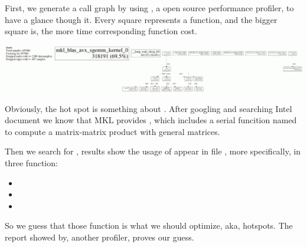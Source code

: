 \documentclass{article}
\begin{document}
\noindent{}First, we generate a call graph by using ,
 a open source performance profiler, to have a glance though it. Every
 square represents a function, and the bigger square is, the more time
 corresponding function cost.%

\includegraphics[keepaspectratio=true,width=\dimmin{}{\dimwidth{0.90}}]{images/100001994364201}{}%

\noindent{}Obviously, the hot spot is something about . After googling
and searching Intel document we know that MKL provides ,
which includes a serial funcition named 
to compute a matrix-matrix product with general matrices.%

Then we search for , results show the usage of 
 appear in file , more specifically, in three function:%

\begin{itemize}[noitemsep,topsep=\mdcompacttopsep]%

\item{}%

\item{}%

\item{}%
\end{itemize}%

\noindent{}So we guess that those function is what we should optimize, aka, hotspots.
The report showed by, another profiler, proves our guess.%
\end{document}
